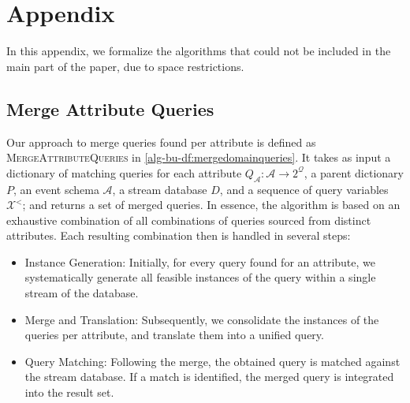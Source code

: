 \appendix
\section{Appendix}
\label{app}
In this appendix, we formalize the algorithms that could not be included in
the main part of the paper, due to space restrictions.
\subsection{Merge Attribute Queries}
Our approach to merge queries found per attribute is defined as
\textsc{MergeAttributeQueries} in \autoref{alg-bu-df:mergedomainqueries}.
It takes as input a dictionary of matching queries for each attribute
$Q_{\mathcal{A}}: \mathcal{A} \rightarrow 2^{\mathcal{Q}}$, a parent
dictionary $P$, an event schema $\mathcal{A}$, a stream database $D$, and a
sequence of query variables $\mathcal{X}^<$; and returns a set of merged
queries.
In essence, the algorithm is based on an exhaustive combination of all
combinations of queries sourced from distinct attributes. Each resulting
combination then is handled in several steps:
\begin{itemize}
\item Instance Generation: Initially, for every query found for an
attribute, we systematically
generate all
feasible instances of the query within a single stream of the database.
\item Merge and Translation: Subsequently, we consolidate the instances of
the queries per attribute, and translate them into a unified query.
\item Query Matching: Following the merge, the obtained query is matched
against the stream database. If a match is identified, the merged query is
integrated into the result set.
\end{itemize}

